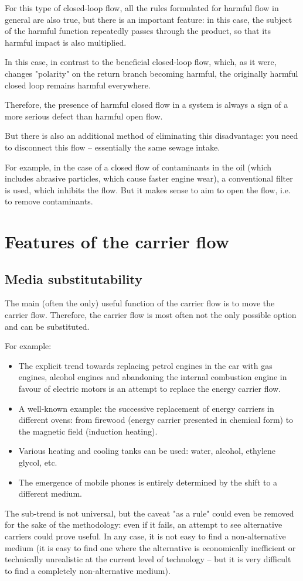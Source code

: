 \documentclass[a4paper,11pt]{article}
\begin{document}
For this type of closed-loop flow, all the rules formulated for harmful flow
in general are also true, but there is an important feature: in this case, the
subject of the harmful function repeatedly passes through the product, so that
its harmful impact is also multiplied.

In this case, in contrast to the beneficial closed-loop flow, which, as it
were, changes "polarity" on the return branch becoming harmful, the originally
harmful closed loop remains harmful everywhere.

Therefore, the presence of harmful closed flow in a system is always a sign of
a more serious defect than harmful open flow.

But there is also an additional method of eliminating this disadvantage: you
need to disconnect this flow -- essentially the same sewage intake.

For example, in the case of a closed flow of contaminants in the oil (which
includes abrasive particles, which cause faster engine wear), a conventional
filter is used, which inhibits the flow. But it makes sense to aim to open the
flow, i.e. to remove contaminants.

\section{Features of the carrier flow}

\subsection{Media substitutability}

The main (often the only) useful function of the carrier flow is to move the
carrier flow. Therefore, the carrier flow is most often not the only possible
option and can be substituted.

For example:
\begin{itemize}
\item The explicit trend towards replacing petrol engines in the car with gas
  engines, alcohol engines and abandoning the internal combustion engine in
  favour of electric motors is an attempt to replace the energy carrier flow.
\item A well-known example: the successive replacement of energy carriers in
  different ovens: from firewood (energy carrier presented in chemical form)
  to the magnetic field (induction heating).
\item Various heating and cooling tanks can be used: water, alcohol, ethylene
  glycol, etc.
\item The emergence of mobile phones is entirely determined by the shift to a
  different medium.
\end{itemize}
The sub-trend is not universal, but the caveat "as a rule" could even be
removed for the sake of the methodology: even if it fails, an attempt to see
alternative carriers could prove useful. In any case, it is not easy to find a
non-alternative medium (it is easy to find one where the alternative is
economically inefficient or technically unrealistic at the current level of
technology -- but it is very difficult to find a completely non-alternative
medium).
\end{document}
